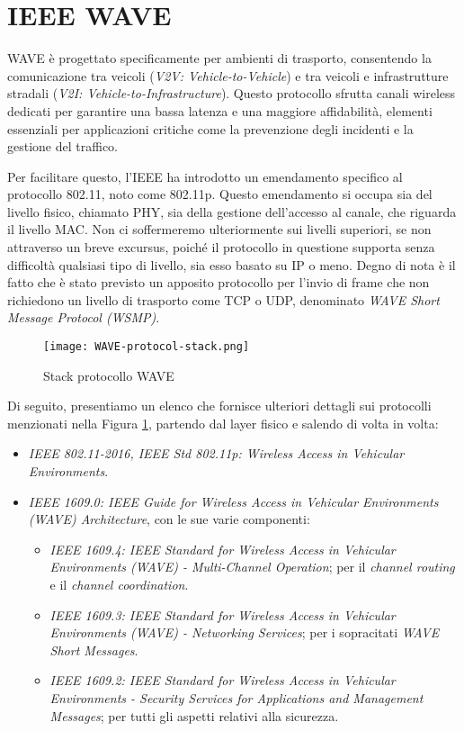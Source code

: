 \section{IEEE WAVE}
WAVE è progettato specificamente per ambienti di trasporto, consentendo la comunicazione tra veicoli (\textit{V2V: Vehicle-to-Vehicle}) e tra veicoli e infrastrutture stradali (\textit{V2I: Vehicle-to-Infrastructure}). Questo protocollo sfrutta canali wireless dedicati per garantire una bassa latenza e una maggiore affidabilità, elementi essenziali per applicazioni critiche come la prevenzione degli incidenti e la gestione del traffico. 

Per facilitare questo, l'IEEE ha introdotto un emendamento specifico al protocollo 802.11, noto come 802.11p\cite{std2007wireless}. Questo emendamento si occupa sia del livello fisico, chiamato PHY, sia della gestione dell'accesso al canale, che riguarda il livello MAC. Non ci soffermeremo ulteriormente sui livelli superiori, se non attraverso un breve excursus, poiché il protocollo in questione supporta senza difficoltà qualsiasi tipo di livello, sia esso basato su IP o meno\cite{DSRC-Based-vehicular}. Degno di nota è il fatto che è stato previsto un apposito protocollo per l'invio di frame che non richiedono un livello di trasporto come TCP o UDP, denominato \textit{WAVE Short Message Protocol (WSMP)}.

\begin{figure}[h!]
    \centering
    \texttt{[image: WAVE-protocol-stack.png]}
    \caption{Stack protocollo WAVE}
    \label{fig:wave_stack}
\end{figure}

Di seguito, presentiamo un elenco che fornisce ulteriori dettagli sui protocolli menzionati nella Figura \ref{fig:wave_stack}, partendo dal layer fisico e salendo di volta in volta:

\begin{itemize}
    \item \textit{IEEE 802.11-2016, IEEE Std 802.11p: Wireless Access in Vehicular Environments}.
    \item \textit{IEEE 1609.0: IEEE Guide for Wireless Access in Vehicular Environments (WAVE) Architecture}, con le sue varie componenti\cite{8686445}: 
        \begin{itemize}
            \item \textit{IEEE 1609.4: IEEE Standard for Wireless Access in Vehicular Environments (WAVE) - Multi-Channel Operation}; per il \textit{channel routing} e il \textit{channel coordination}\cite{7435228}.
            \item \textit{IEEE 1609.3: IEEE Standard for Wireless Access in Vehicular Environments (WAVE) - Networking Services}; per i sopracitati \textit{WAVE Short Messages}\cite{9374154}.
            \item \textit{IEEE 1609.2: IEEE Standard for Wireless Access in Vehicular Environments - Security Services for Applications and Management Messages}; per tutti gli aspetti relativi alla sicurezza\cite{10075082}.
        \end{itemize}
\end{itemize}

